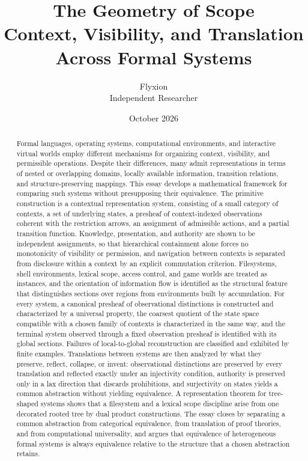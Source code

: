 \documentclass[11pt]{article}
\title{The Geometry of Scope\\[0.5em]\large Context, Visibility, and Translation Across Formal Systems}
\author{Flyxion\\[0.2em]\small Independent Researcher}
\date{October 2026}
\theoremstyle{definition}
\theoremstyle{remark}
\begin{document}
\maketitle

\begin{abstract}
\noindent Formal languages, operating systems, computational environments, and interactive virtual worlds employ different mechanisms for organizing context, visibility, and permissible operations. Despite their differences, many admit representations in terms of nested or overlapping domains, locally available information, transition relations, and structure-preserving mappings. This essay develops a mathematical framework for comparing such systems without presupposing their equivalence. The primitive construction is a contextual representation system, consisting of a small category of contexts, a set of underlying states, a presheaf of context-indexed observations coherent with the restriction arrows, an assignment of admissible actions, and a partial transition function. Knowledge, presentation, and authority are shown to be independent assignments, so that hierarchical containment alone forces no monotonicity of visibility or permission, and navigation between contexts is separated from disclosure within a context by an explicit commutation criterion. Filesystems, shell environments, lexical scope, access control, and game worlds are treated as instances, and the orientation of information flow is identified as the structural feature that distinguishes sections over regions from environments built by accumulation. For every system, a canonical presheaf of observational distinctions is constructed and characterized by a universal property, the coarsest quotient of the state space compatible with a chosen family of contexts is characterized in the same way, and the terminal system observed through a fixed observation presheaf is identified with its global sections. Failures of local-to-global reconstruction are classified and exhibited by finite examples. Translations between systems are then analyzed by what they preserve, reflect, collapse, or invent: observational distinctions are preserved by every translation and reflected exactly under an injectivity condition, authority is preserved only in a lax direction that discards prohibitions, and surjectivity on states yields a common abstraction without yielding equivalence. A representation theorem for tree-shaped systems shows that a filesystem and a lexical scope discipline arise from one decorated rooted tree by dual product constructions. The essay closes by separating a common abstraction from categorical equivalence, from translation of proof theories, and from computational universality, and argues that equivalence of heterogeneous formal systems is always equivalence relative to the structure that a chosen abstraction retains.
\end{abstract}

\tableofcontents
\bigskip







\end{document}
